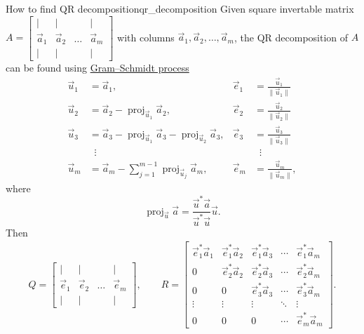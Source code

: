 \begin{theorema}{How to find QR decomposition}{qr_decomposition}
    Given square invertable matrix $A=\begin{bmatrix}
            | & | & \ & | \\
            \vec{a}_{1} & \vec{a}_{2} & \dots & \vec{a}_{m} \\
            | & | & \ & |
        \end{bmatrix}$ with columns $\vec{a}_1,\vec{a}_2,\ldots,\vec{a}_m$, the QR decomposition of $A$ can be found using \href{https://en.wikipedia.org/wiki/Gram%E2%80%93Schmidt_process}{Gram–Schmidt process}
        $$
        \begin{aligned} 
            \vec{u} _{1}&= \vec{a} _{1},& \vec{e} _{1}&={\frac { \vec{u} _{1}}{\| \vec{u} _{1}\|}}\\ \vec{u} _{2}&= \vec{a} _{2}-\operatorname {proj} _{ \vec{u} _{1}} \vec{a} _{2},& \vec{e} _{2}&={\frac { \vec{u} _{2}}{\| \vec{u} _{2}\|}}\\ \vec{u} _{3}&= \vec{a} _{3}-\operatorname {proj} _{ \vec{u} _{1}} \vec{a} _{3}-\operatorname {proj} _{ \vec{u} _{2}} \vec{a} _{3},& \vec{e} _{3}&={\frac { \vec{u} _{3}}{\| \vec{u} _{3}\|}}\\&\;\;\vdots &&\;\;\vdots \\ \vec{u} _{m}&= \vec{a} _{m}-\sum _{j=1}^{m-1}\operatorname {proj} _{ \vec{u} _{j}} \vec{a} _{m},& \vec{e} _{m}&={\frac { \vec{u} _{m}}{\| \vec{u} _{m}\|}},
        \end{aligned}
        $$
        where 
        $$
             \operatorname {proj}_{ \vec{u} } \vec{a} 
             ={\frac {  \vec{u}^*\vec{a} }{\vec{u}^{*}\vec{u} }}{ \vec{u} }.
        $$
        Then 
        \begin{eqnarray}
            Q=
            \begin{bmatrix}
                | & | & \ & | \\
                \vec{e}_{1} & \vec{e}_{2} & \dots & \vec{e}_{m} \\
                | & | & \ & |
            \end{bmatrix},\qquad
            R=
            \begin{bmatrix}
                 \vec{e} _{1}^* \vec{a} _{1} & \vec{e} _{1}^* \vec{a} _{2} & \vec{e} _{1}^* \vec{a} _{3} &\cdots & \vec{e} _{1}^* \vec{a} _{m} \\0& \vec{e} _{2}^* \vec{a} _{2} & \vec{e} _{2}^* \vec{a} _{3} &\cdots & \vec{e} _{2}^* \vec{a} _{m} \\0&0& \vec{e} _{3}^* \vec{a} _{3} &\cdots & \vec{e} _{3}^* \vec{a} _{m} \\\vdots &\vdots &\vdots &\ddots &\vdots \\0&0&0&\cdots & \vec{e} _{m}^* \vec{a} _{m} 
            \end{bmatrix}.\nonumber
        \end{eqnarray}

\end{theorema}
